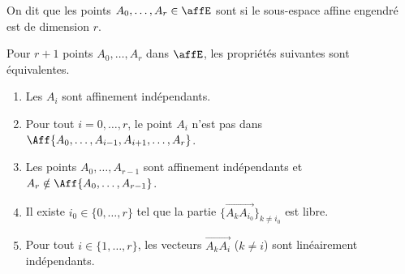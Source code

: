 \begin{definition}
	On dit que les points \( A_0,\ldots, A_r\in \affE\) sont  si le sous-espace affine engendré est de dimension \( r\).
\end{definition}

\begin{proposition}  \label{PropGAneHg}
	Pour \( r+1\) points \( A_0,\ldots, A_r\) dans \( \affE\), les propriétés suivantes sont équivalentes.
	\begin{enumerate}
		\item		\label{ITEMooONZHooWIzXdw}
		      Les \( A_i\) sont affinement indépendants.
		\item \label{ITEMooOMCRooNiRtSW}
		      Pour tout \( i=0,\ldots, r\), le point \( A_i\) n'est pas dans \( \Aff\{ A_0,\ldots, A_{i-1}, A_{i+1},\ldots, A_r \}\).
		\item\label{ItemrAzkIl}
		      Les points \( A_0,\ldots, A_{r-1}\) sont affinement indépendants et \( A_r\notin\Aff\{ A_0,\ldots, A_{r-1} \}\).
		\item		\label{ITEMooSLMDooFOHLEG}
		      Il existe \( i_0\in\{ 0,\ldots,r \}\) tel que la partie \( \{ \overrightarrow{ A_kA_{i_0} } \}_{k\neq i_0}\) est libre.
		\item\label{ItemFBfcuq}
		      Pour tout \( i\in\{ 1,\ldots, r \}\), les vecteurs \( \overrightarrow{ A_kA_i }\) (\( k\neq i\)) sont linéairement indépendants.
	\end{enumerate}
\end{proposition}

